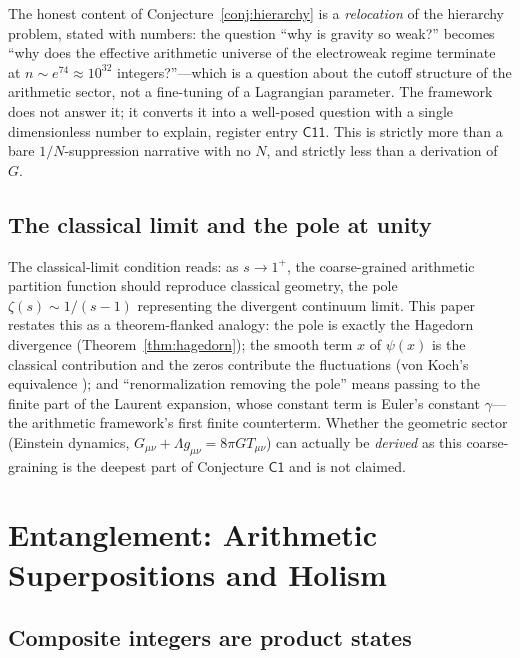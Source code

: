 \documentclass[11pt,a4paper]{article}
\theoremstyle{plain}
\theoremstyle{definition}
\theoremstyle{remark}
\begin{document}
The honest content of Conjecture~\ref{conj:hierarchy} is a \emph{relocation} of the hierarchy
problem, stated with numbers: the question ``why is gravity so weak?'' becomes ``why does the
effective arithmetic universe of the electroweak regime terminate at $n\sim e^{74}\approx
10^{32}$ integers?''---which is a question about the cutoff structure of the arithmetic
sector, not a fine-tuning of a Lagrangian parameter. The framework does not answer it; it
converts it into a well-posed question with a single dimensionless number to explain,
register entry $\mathsf{C11}$. This is strictly more than a bare
$1/N$-suppression narrative with no $N$, and strictly less than a derivation of $G$.

\subsection{The classical limit and the pole at unity}

The classical-limit condition reads: as $s\to1^{+}$, the coarse-grained
arithmetic partition function should reproduce classical geometry, the pole
$\zeta(s)\sim1/(s-1)$ representing the divergent continuum limit. This paper
restates this as a theorem-flanked analogy: the pole is exactly the Hagedorn divergence
(Theorem~\ref{thm:hagedorn}); the smooth term $x$ of $\psi(x)$ is the classical contribution
and the zeros contribute the fluctuations (von Koch's equivalence
\cite{vonkoch1901}); and ``renormalization removing the pole'' means passing to the
finite part of the Laurent expansion, whose constant term is Euler's constant $\gamma$---the
arithmetic framework's first finite counterterm. Whether the geometric sector (Einstein
dynamics, $G_{\mu\nu}+\Lambda g_{\mu\nu}=8\pi GT_{\mu\nu}$) can actually be \emph{derived} as
this coarse-graining is the deepest part of Conjecture $\mathsf{C1}$ and is not claimed.

\section{Entanglement: Arithmetic Superpositions and Holism}\label{sec:entangle}

\subsection{Composite integers are product states}
\end{document}

